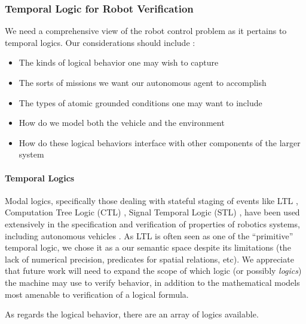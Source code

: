 \documentclass{article}
\begin{document}
\subsubsection{Temporal Logic for Robot Verification}


We need a comprehensive view of the robot control problem as it pertains to
temporal logics. Our considerations should include :

\begin{itemize}
\item The kinds of logical behavior one may wish to capture
\item The sorts of missions we want our autonomous agent to accomplish
\item The types of atomic grounded conditions one may want to include
\item How do we model both the vehicle and the environment
\item How do these logical behaviors interface with other components of the
 larger system
\end{itemize}

\paragraph{Temporal Logics}



Modal logics, specifically those dealing with stateful staging of events like
LTL \cite{ltl95}, Computation Tree Logic (CTL) \cite{yooCTL}, Signal Temporal
Logic (STL) \cite{stlAut} , have been used extensively in the specification and
verification of properties of robotics systems, including autonomous vehicles .
As LTL is often seen as one of the ``primitive'' temporal logic, we chose it as
a our semantic space despite its limitations (the lack of numerical precision,
predicates for spatial relations, etc). We appreciate that future work will need
to expand the scope of which logic (or possibly \emph{logics}) the machine may
use to verify behavior, in addition to the mathematical models most amenable to
verification of a logical formula.

As regards the logical behavior, there are an array of logics available.
\end{document}
